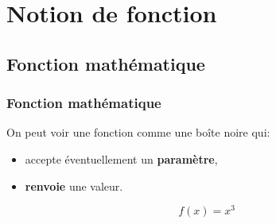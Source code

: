 \documentclass[svgnames,11pt]{beamer}
\begin{document}
\section{Notion de fonction}
\subsection{Fonction mathématique}
\begin{frame}
    \frametitle{Fonction mathématique}
    On peut voir une fonction comme une boîte noire qui:
    \begin{itemize}
        \item accepte éventuellement un \textbf{paramètre},
        \item \textbf{renvoie} une valeur.
    \end{itemize}
$$f(x)=x^3$$
    \begin{center}
    \end{center}

\end{frame}
\end{document}
